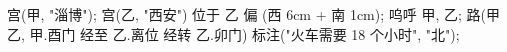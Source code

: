 \usemodule[zhfonts]

宫(甲, "淄博");
宫(乙, "西安") 位于 乙 偏 (西 6cm + 南 1cm);
呜呼 甲, 乙;
路(甲乙, 甲.酉门 经至 乙.离位 经转 乙.卯门) 标注("火车需要 18 个小时", "北");
\stopuseMPgraphic

\startTEXpage[offset=4pt]
\stopTEXpage
